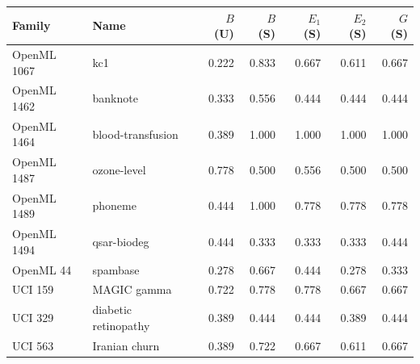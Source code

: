 \begin{tabular}{llrrrrr}\toprule
Family & Name & $B$ (U) & $B$ (S) & $E_1$ (S) & $E_2$ (S) & $G$ (S)\\\midrule
OpenML 1067 & kc1 & 0.222 & 0.833 & 0.667 & 0.611 & 0.667\\
OpenML 1462 & banknote & 0.333 & 0.556 & 0.444 & 0.444 & 0.444\\
OpenML 1464 & blood-transfusion & 0.389 & 1.000 & 1.000 & 1.000 & 1.000\\
OpenML 1487 & ozone-level & 0.778 & 0.500 & 0.556 & 0.500 & 0.500\\
OpenML 1489 & phoneme & 0.444 & 1.000 & 0.778 & 0.778 & 0.778\\
OpenML 1494 & qsar-biodeg & 0.444 & 0.333 & 0.333 & 0.333 & 0.444\\
OpenML 44 & spambase & 0.278 & 0.667 & 0.444 & 0.278 & 0.333\\
UCI 159 & MAGIC gamma & 0.722 & 0.778 & 0.778 & 0.667 & 0.667\\
UCI 329 & diabetic retinopathy & 0.389 & 0.444 & 0.444 & 0.389 & 0.444\\
UCI 563 & Iranian churn & 0.389 & 0.722 & 0.667 & 0.611 & 0.667\\
\bottomrule\end{tabular}
